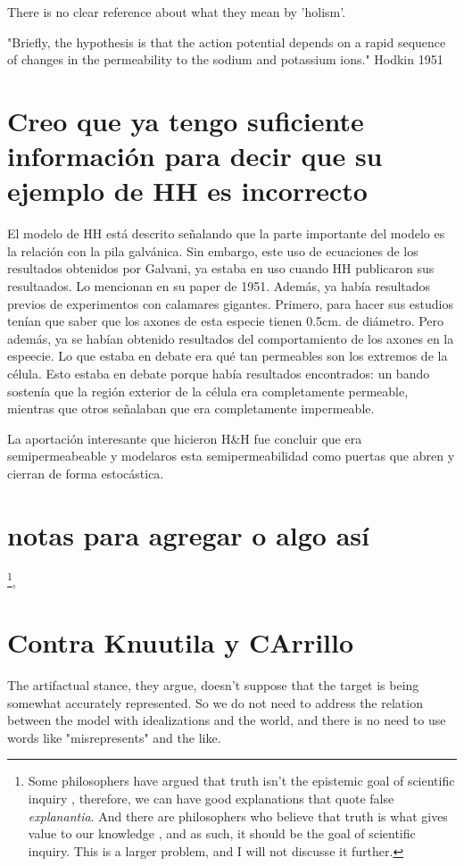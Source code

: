 There is no clear reference about what they mean by 'holism'.

"Briefly,  the hypothesis is that the action potential depends on a rapid sequence of changes  in the permeability to the sodium and potassium ions." Hodkin 1951


\section{Creo que ya tengo suficiente información para decir que su ejemplo de HH es incorrecto}

El modelo de HH está descrito señalando que la parte importante del modelo es la relación con la pila galvánica.
Sin embargo, este uso de ecuaciones de los resultados obtenidos por Galvani, ya estaba en uso cuando HH publicaron sus resultaados.
Lo mencionan en su paper de 1951.
Además, ya había resultados previos de experimentos con calamares gigantes.
Primero, para hacer sus estudios tenían que saber que los axones de esta especie tienen 0.5cm. de diámetro.
Pero además, ya se habían obtenido resultados del comportamiento de los axones en la espeecie.
Lo que estaba en debate era qué tan permeables son los extremos de la célula.
Esto estaba en debate porque había resultados encontrados: un bando sostenía que la región exterior de la célula era completamente permeable, mientras que otros señalaban que era completamente impermeable.


La aportación interesante que hicieron H\&H fue concluir que era semipermeabeable y modelaros esta semipermeabilidad como puertas que abren y cierran de forma estocástica.



\section{notas para agregar o algo así}

\footnote
{Some philosophers have argued that truth isn't the epistemic goal of scientific inquiry \cite{elgin2017true, Potochnik2017-POTIAT-3}, therefore, we can have good explanations that quote false \emph{explanantia}.
	And there are philosophers who believe that truth is what gives value to our knowledge \cite{pritchard2021, pritchard2021a}, and as such, it should be the goal of scientific inquiry.
	This is a larger problem, and I will not discusse it further.
},


\section{Contra Knuutila y CArrillo}
The artifactual stance, they argue, doesn't suppose that the target is being somewhat accurately represented.
So we do not need to address the relation between the model with idealizations and the world, and there is no need to use words like "misrepresents" and the like.

